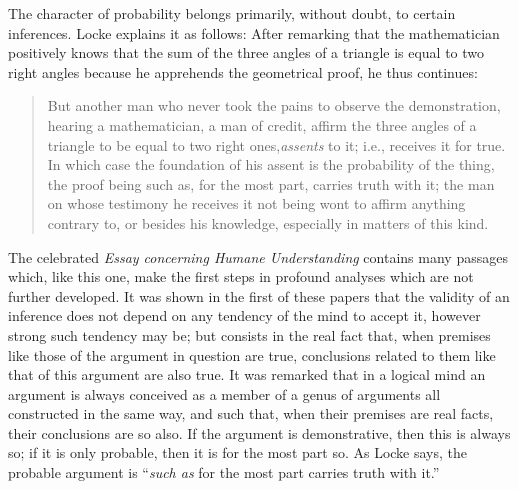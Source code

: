 The character of probability belongs primarily, without doubt, to certain inferences. Locke explains it as follows: After remarking that the mathematician positively knows that the sum of the three angles of a triangle is equal to two right angles because he apprehends the geometrical proof, he thus continues: \begin{quote}
But another man who never took the pains to observe the demonstration, hearing a mathematician, a man of credit, affirm the three angles of a triangle to be equal to two right ones,\emph{assents} to it; i.e., receives it for true. In which case the foundation of his assent is the probability of the thing, the proof being such as, for the most part, carries truth with it; the man on whose testimony he receives it not being wont to affirm anything contrary to, or besides his knowledge, especially in matters of this kind.
\end{quote}
The celebrated \emph{Essay concerning Humane Understanding} contains many passages which, like this one, make the first steps in profound analyses which are not further developed. It was shown in the first of these papers that the validity of an inference does not depend on any tendency of the mind to accept it, however strong such tendency may be; but consists in the real fact that, when premises like those of the argument in question are true, conclusions related to them like that of this argument are also true. It was remarked that in a logical mind an argument is always conceived as a member of a genus of arguments all constructed in the same way, and such that, when their premises are real facts, their conclusions are so also. If the argument is demonstrative, then this is always so; if it is only probable, then it is for the most part so. As Locke says, the probable argument is ``\emph{such as} for the most part carries truth with it.''

